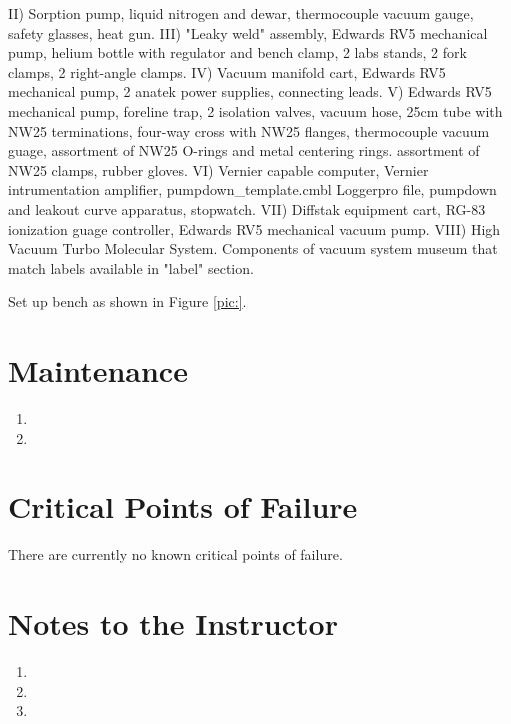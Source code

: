 \documentclass[justified]{tufte-book}
\begin{document}
II)   Sorption pump, liquid nitrogen and dewar, thermocouple vacuum gauge, safety glasses, heat gun.\newline
III)  "Leaky weld" assembly, Edwards RV5 mechanical pump, helium bottle with regulator and bench clamp, 2 labs stands, 2 fork clamps, 2 right-angle clamps.\newline
IV)   Vacuum manifold cart, Edwards RV5 mechanical pump, 2 anatek power supplies, connecting leads.\newline
V)    Edwards RV5 mechanical pump, foreline trap, 2 isolation valves, vacuum hose, 25cm tube with NW25 terminations, four-way cross with NW25 flanges, thermocouple vacuum guage, assortment of NW25 O-rings and metal centering rings. assortment of NW25 clamps, rubber gloves.\newline
VI)   Vernier capable computer, Vernier intrumentation amplifier, pumpdown_template.cmbl Loggerpro file, pumpdown and leakout curve apparatus, stopwatch.\newline
VII)  Diffstak equipment cart, RG-83 ionization guage controller, Edwards RV5 mechanical vacuum pump.
VIII) High Vacuum Turbo Molecular System.\newline
Components of vacuum system museum that match labels available in "label" section.\newline



Set up bench as shown in Figure \ref{pic:}.

\section{Maintenance}

\begin{enumerate}
\item 
\item 
\end{enumerate}

\section{Critical Points of Failure}

There are currently no known critical points of failure.

\section{Notes to the Instructor}
\begin{enumerate}
\item 
\item 
\item 
\end{enumerate}
\end{document}
